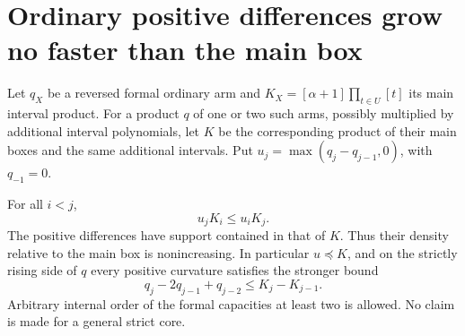 \section{Ordinary positive differences grow no faster than the main box}
Let $q_X$ be a reversed formal ordinary arm and
$K_X=[\alpha+1]\prod_{t\in U}[t]$ its main interval product.
For a product $q$ of one or two such arms, possibly multiplied
by additional interval polynomials, let $K$ be the corresponding
product of their main boxes and the same additional intervals.
Put $u_j=\max(q_j-q_{j-1},0)$, with $q_{-1}=0$.

\begin{theorem}
For all $i<j$,
\[
                         u_j K_i\le u_i K_j.             \tag{1}
\]
The positive differences have support contained in that of $K$.
Thus their density relative to the main box is nonincreasing.
In particular $u\preceq K$, and on the strictly rising side
of $q$ every positive curvature satisfies the stronger bound
\[
              q_j-2q_{j-1}+q_{j-2}\le K_j-K_{j-1}.       \tag{2}
\]
Arbitrary internal order of the formal capacities at least
two is allowed. No claim is made for a general strict core.
\end{theorem}


